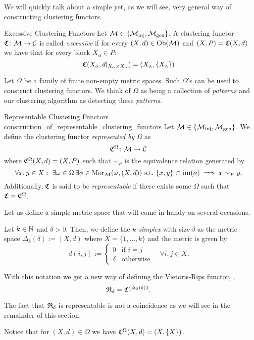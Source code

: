 We will quickly talk about a simple yet, as we will see, very general way of constructing clustering functors.

\begin{definition}{Excessive Clustering Functors \cite[Def.~6.2]{Carlsson2010}}{}
Let $\mathcal{M} \in \{{\mathcal{M}_\mathrm{inj}}, {\mathcal{M}_\mathrm{gen}}\}$. A clustering functor $\mathfrak{C}\colon \mathcal{M} \to \mathcal{C}$ is called \emph{excessive} if for every $(X,d) \in \mathrm {Ob}(\mathcal{M})$ and $(X,P) = \mathfrak{C}(X,d)$ we have that for every block $X_\alpha \in P$:
$$
\mathfrak{C}(X_\alpha, d|_{X_\alpha \times X_\alpha}) = (X_\alpha, \{X_\alpha\})
$$
\end{definition}

Let $\Omega$ be a family of finite non-empty metric spaces. Such $\Omega$'s can be used to construct clustering functors. We think of $\Omega$ as being a collection of \emph{patterns} and our clustering algorithm as detecting these \emph{patterns}.

\begin{definition}{Representable Clustering Functors \cite[Sec.~6.2]{Carlsson2010}}{construction_of_representable_clustering_functors}
Let $\mathcal{M} \in \{{\mathcal{M}_\mathrm{inj}}, {\mathcal{M}_\mathrm{gen}}\}$. We define the clustering functor \emph{represented by $\Omega$} as
$$
\mathfrak{C}^\Omega\colon \mathcal{M} \to \mathcal{C}
$$
where $\mathfrak{C}^\Omega(X,d) = (X, P)$ such that $\sim_P$ 
is the equivalence relation generated by
\begin{equation*}
    \forall x,y \in X: \ \exists \omega \in \Omega \,\exists \phi \in \mathrm {Mor}_{\mathcal{M}}(\omega, (X,d)) \ \text{s.t.} \ \{x,y\} \subset \operatorname*{im}(\phi) \implies x \sim_P y.
\end{equation*}
Additionally, $\mathfrak{C}$ is said to be \emph{representable} if there exists some $\Omega$ such that $\mathfrak{C} = \mathfrak{C}^\Omega$.
\end{definition}

Let us define a simple metric space that will come in handy on several occasions.
\begin{definition}{}{}
    Let $k \in \mathbb N$ and $\delta > 0$. Then, we define the \emph{$k$-simplex} with size $\delta$ as the metric space $\Delta_k(\delta) := (X,d)$ where $X = \{1, \dots, k\}$ and the metric is given by
    $$
    d(i,j) := \begin{cases}
        0 & \text{if } i = j\\
        \delta & \text{otherwise}
    \end{cases} \quad \forall i,j \in X.
    $$
\end{definition}

\begin{example}{}{}
With this notation we get a new way of defining the Vietoris-Rips functor, \ie,
$$
\mathfrak{R}_\delta = \mathfrak{C}^{\{\Delta_2(\delta)\}}.
$$
\end{example}
The fact that $\mathfrak{R}_\delta$ is representable is not a coincidence as we will see in the remainder of this section.
\begin{myremark}{\cite[Rem.~6.3]{Carlsson2010}}{}
Notice that for $(X,d) \in \Omega$ we have $\mathfrak{C}^\Omega(X,d) = (X, \{X\})$.
\end{myremark}

